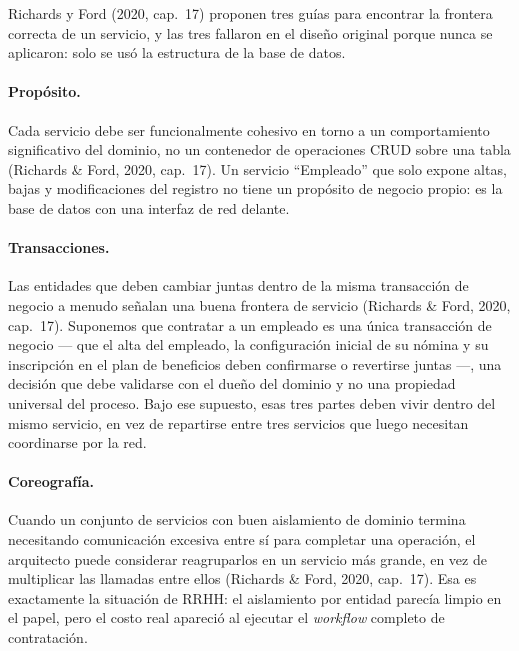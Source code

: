 
Richards y Ford (2020, cap.~17) proponen tres guías para encontrar la frontera
correcta de un servicio, y las tres fallaron en el diseño original porque nunca se
aplicaron: solo se usó la estructura de la base de datos.

\paragraph{Propósito.}
Cada servicio debe ser funcionalmente cohesivo en torno a un comportamiento
significativo del dominio, no un contenedor de operaciones CRUD sobre una tabla
(Richards \& Ford, 2020, cap.~17). Un servicio ``Empleado'' que solo expone altas,
bajas y modificaciones del registro no tiene un propósito de negocio propio: es la
base de datos con una interfaz de red delante.

\paragraph{Transacciones.}
Las entidades que deben cambiar juntas dentro de la misma transacción de negocio
a menudo señalan una buena frontera de servicio (Richards \& Ford, 2020,
cap.~17). Suponemos que contratar a un empleado es una única transacción de
negocio --- que el alta del empleado, la configuración inicial de su nómina y
su inscripción en el plan de beneficios deben confirmarse o revertirse
juntas ---, una decisión que debe validarse con el dueño del dominio y no una
propiedad universal del proceso. Bajo ese supuesto, esas tres partes deben
vivir dentro del mismo servicio, en vez de repartirse entre tres servicios que
luego necesitan coordinarse por la red.

\paragraph{Coreografía.}
Cuando un conjunto de servicios con buen aislamiento de dominio termina
necesitando comunicación excesiva entre sí para completar una operación, el
arquitecto puede considerar reagruparlos en un servicio más grande, en vez de
multiplicar las llamadas entre ellos (Richards \& Ford, 2020, cap.~17). Esa es exactamente la situación de
RRHH: el aislamiento por entidad parecía limpio en el papel, pero el costo real
apareció al ejecutar el \emph{workflow} completo de contratación.

